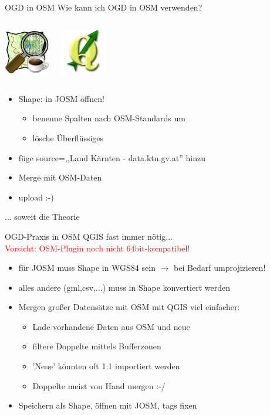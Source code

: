 \documentclass{beamer}
\begin{document}
\begin{frame}{OGD in OSM}
	Wie kann ich OGD in OSM verwenden?

	\begin{columns}[c] 
		\begin{center}
			\includegraphics[width=2cm]{josm-latest.png}
		\end{center}
		\begin{center}
			\includegraphics[width=2cm]{qgis-icon.png}
		\end{center}
	\end{columns}


	\begin{itemize}
		\item Shape: in JOSM öffnen!
		\pause
		\begin{itemize}
			\item benenne Spalten nach OSM-Standards um
			\item lösche Überflüssiges
		\end{itemize}
		\item füge source=,,Land Kärnten - data.ktn.gv.at'' hinzu
		\item Merge mit OSM-Daten
		\item upload :-)
	\end{itemize}
	\pause
	\hfill ... soweit die Theorie

\end{frame}

\begin{frame}{OGD-Praxis in OSM}
	QGIS fast immer nötig... \pause \\
	\hfill \textcolor{red}{Vorsicht: OSM-Plugin noch nicht 64bit-kompatibel!}
\pause
	\begin{itemize}
		\item für JOSM muss Shape in WGS84 sein $\rightarrow$ bei Bedarf umprojizieren!
		\item alles andere (gml,csv,...) muss in Shape konvertiert werden
		\item Mergen großer Datensätze mit OSM mit QGIS viel einfacher:
		\begin{itemize}
			\item Lade vorhandene Daten aus OSM und neue
			\item filtere Doppelte mittels Bufferzonen 
			\item 'Neue' könnten oft 1:1 importiert werden
			\item Doppelte meist von Hand mergen :-/
		\end{itemize}
		\item Speichern als Shape, öffnen mit JOSM, tags fixen
	\end{itemize}
\end{frame}
\end{document}
